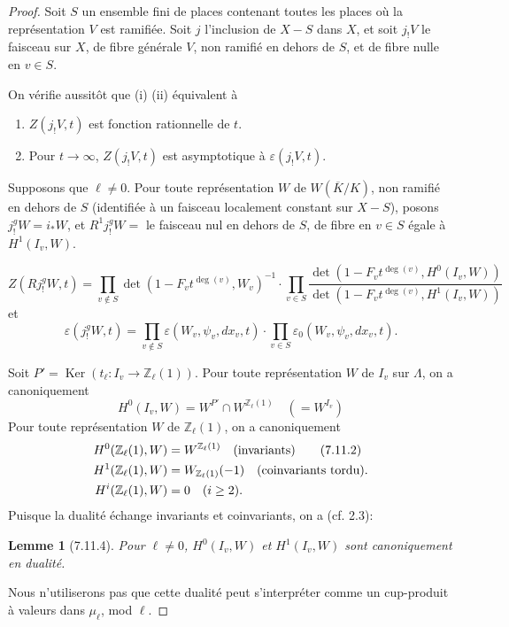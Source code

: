 \documentclass[11pt]{amsart}
\theoremstyle{plain}
\newtheorem{lemma}[theorem]{Lemme}
\theoremstyle{definition}
\DeclareMathOperator{\Ker}{Ker}
\begin{document}
\begin{proof}
Soit $S$ un ensemble fini de places contenant toutes les places o\`u la repr\'esentation $V$ est ramifi\'ee. Soit $j$ l'inclusion de $X - S$ dans $X$, et soit $j_!V$ le faisceau sur $X$, de fibre g\'en\'erale $V$, non ramifi\'e en dehors de $S$, et de fibre nulle en $v \in S$.

On v\'erifie aussit\^ot que (i) (ii) \'equivalent \`a
\begin{enumerate}
\item[(i')] $Z(j_!V,t)$ est fonction rationnelle de $t$.
\item[(ii')] Pour $t \to \infty$, $Z(j_!V,t)$ est asymptotique \`a $\varepsilon(j_!V,t)$.
\end{enumerate}

Supposons que $\ell \not= 0$. Pour toute repr\'esentation $W$ de $W(\overline{K}/K)$, non ramifi\'e en dehors de $S$ (identifi\'ee \`a un faisceau localement constant sur $X - S$), posons $j_!^g W = i_*W$, et $R^1j_!^g W =$ le faisceau nul en dehors de $S$, de fibre en $v \in S$ \'egale \`a $H^1(I_v,W)$.

\begin{equation}
Z(Rj_!^g W,t) = \prod_{v \notin S} \det(1-F_v t^{\deg(v)}, W_v)^{-1} \cdot \prod_{v \in S} \frac{\det(1-F_v t^{\deg(v)}, H^0(I_v,W))}{\det(1-F_v t^{\deg(v)}, H^1(I_v,W))}
\tag{7.11.0}
\end{equation}
et
\[
\varepsilon(j_!^g W,t) = \prod_{v \notin S} \varepsilon(W_v,\psi_v,dx_v,t) \cdot \prod_{v \in S} \varepsilon_0(W_v,\psi_v,dx_v,t).
\]

Soit $P' = \Ker(t_\ell: I_v \to \mathbb{Z}_\ell(1))$. Pour toute repr\'esentation $W$ de $I_v$ sur $\Lambda$, on a canoniquement
\begin{equation}
H^0(I_v,W) = W^{P'} \cap W^{\mathbb{Z}_\ell(1)} \quad (= W^{I_v})
\tag{7.11.1}
\end{equation}
Pour toute repr\'esentation $W$ de $\mathbb{Z}_\ell(1)$, on a canoniquement
\begin{align}
H^0(\mathbb{Z}_\ell(1),W) &= W^{\mathbb{Z}_\ell(1)} \quad \text{(invariants)} \tag{7.11.2}\\
H^1(\mathbb{Z}_\ell(1),W) &= W_{\mathbb{Z}_\ell(1)}(-1) \quad \text{(coinvariants tordu).} \notag\\
H^i(\mathbb{Z}_\ell(1),W) &= 0 \quad (i \geq 2). \notag
\end{align}
Puisque la dualit\'e \'echange invariants et coinvariants, on a (cf. 2.3):

\begin{lemma}[7.11.4]
Pour $\ell \not= 0$, $H^0(I_v,W)$ et $H^1(I_v,W)$ sont canoniquement en dualit\'e.
\end{lemma}
Nous n'utiliserons pas que cette dualit\'e peut s'interpr\'eter comme un cup-produit \`a valeurs dans $\mu_\ell$, mod $\ell$.


\end{proof}
\end{document}
